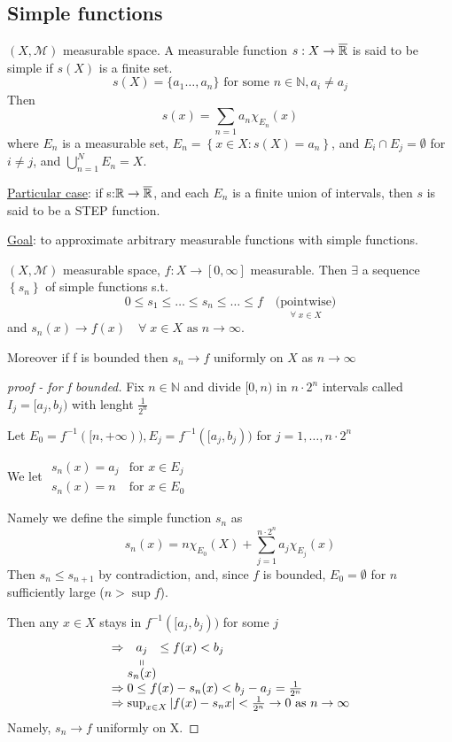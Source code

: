 \subsection*{Simple functions}
\begin{definition}
    \((X, \mathcal{M})\) measurable space. A measurable function \(s:X \to \barreal\) is said to be simple if \(s(X)\) is a finite set. 
    \[
        s(X) = \{a_1 \ldots, a_n\} \mbox{ for some }n \in \mathbb{N}, a_i \not= a_j
    \]
    Then 
    \[
        s(x) = \sum_{n = 1} a_n \chi_{E_n}(x)
    \]
    where \(E_n\) is a measurable set, \(E_n = \left\{ x \in X : s(X) = a_n \right\}\), and \(E_i \cap E_j = \emptyset\) for \(i \not = j\), and \(\bigcup_{n = 1}^N E_n = X\).
\end{definition}
\underline{Particular case}: if s:\(\mathbb{R} \to \barreal\), and each \(E_n\) is a finite union of intervals, then \(s\) is said to be a STEP function.

\underline{Goal}: to approximate arbitrary measurable functions with simple functions.
\begin{theorem}
    \((X,\mathcal{M})\) measurable space, \(f: X \to [0, \infty]\) measurable. Then \(\exists\) a sequence \(\left\lbrace s_n \right\rbrace\) of simple functions s.t. 
    \[
        0 \leq s_1 \leq \ldots \leq s_n \leq \ldots \leq f \quad \underset{\forall \; x \in X}{\mbox{(pointwise)}}
    \]
    and \(s_n(x) \to f(x) \quad \forall \; x \in X \mbox{ as }n \to \infty\).

Moreover if f is bounded then \(s_n \to f\) uniformly on \(X\) as \(n \to \infty\)
\end{theorem}

\begin{proof}[proof - for f bounded]
    Fix \(n \in \mathbb{N}\) and divide \([0,n)\) in \(n \cdot 2^n\) intervals called \(I_j = [a_j,b_j)\) with lenght \(\frac{1}{2^n}\)

    Let \(E_0 = f^{-1}([n, +\infty)), E_j = f^{-1}([a_j, b_j))\) for \(j = 1, \ldots, n\cdot 2^n\)
    
    We let \(\begin{array}{cc}
        s_n(x) = a_j & \mbox{for } x \in E_j \\
        s_n(x) = n & \mbox{for } x \in E_0
    \end{array}\)

    Namely we define the simple function \(s_n\) as
    \[
    s_n (x) = n\chi_{E_0}(X) + \sum_{j =1}^{n \cdot 2^n} a_j \chi_{E_j}(x)    
    \]
    Then \(s_n \leq s_{n+1}\) by contradiction, and, since \(f\) is bounded, \(E_0 = \emptyset\) for \(n\) sufficiently large (\(n > \sup f\)).

    Then any \(x \in X\) stays in \(f^{-1}([a_j, b_j))\) for some \(j\) 
    \[
        \begin{array}{l}
            \Rightarrow \stackbelow{a_j}{s_n(x)} \leq f(x) < b_j \\
            \Rightarrow 0 \leq f(x)-s_n(x) < b_j - a_j = \frac{1}{2^n} \\
            \Rightarrow \sup_{x \in X} \abs{f(x)- s_n{x}} < \frac{1}{2^n} \to 0 \mbox{ as } n \to \infty
        \end{array}
    \]
    Namely, \(s_n \to f\) uniformly on X.
\end{proof}
